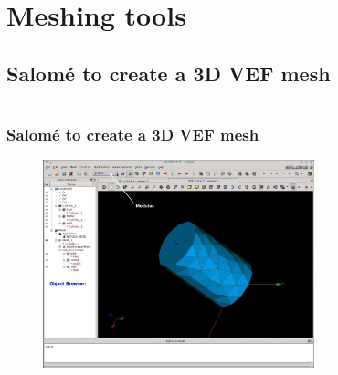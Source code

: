 \documentclass[10pt]{beamer}
\begin{document}
\section{Meshing tools}
\subsection{Salom\'e to create a 3D VEF mesh}
\begin{frame}
\begin{columns}[c] 
\tableofcontents[sections={1-6},currentsection, currentsubsection]
\tableofcontents[sections={7-12},currentsection, currentsubsection]
\end{columns}
\end{frame}
\begin{frame}
\frametitle{Salom\'e to create a 3D VEF mesh}

\begin{figure}
\includegraphics[width=0.7\textwidth]{PICTURES/salome1_2.jpg}
\end{figure}

\end{frame}
\end{document}
